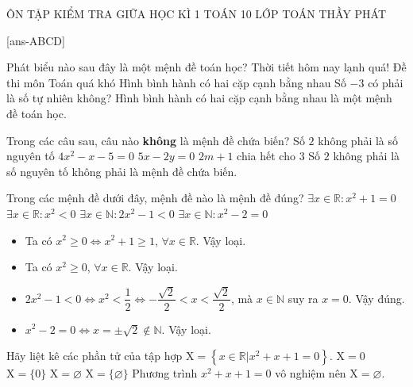 \begin{name}
	{ÔN TẬP KIỂM TRA GIỮA HỌC KÌ 1}
	{TOÁN 10}
	{LỚP TOÁN THẦY PHÁT}
	{\thoigian}
\end{name}

\caulc

[ans-ABCD]

\begin{ex}%
	Phát biểu nào sau đây là một mệnh đề toán học? 
	\choice
	{Thời tiết hôm nay lạnh quá!}
	{Đề thi môn Toán quá khó}
	{\True Hình bình hành có hai cặp cạnh bằng nhau}
	{Số $-3$ có phải là số tự nhiên không?}
	\loigiai
	{ Hình bình hành có hai cặp cạnh bằng nhau là một mệnh đề toán học.
	}
\end{ex}

\begin{ex}%
	Trong các câu sau, câu nào \textbf{không} là mệnh đề chứa biến? 
	\choice
	{\True Số $2$ không phải là số nguyên tố}
	{$4x^2-x-5=0$}
	{$5x-2y=0$}
	{$2m+1$ chia hết cho $3$}
	\loigiai
	{Số $2$ không phải là số nguyên tố không phải là mệnh đề chứa biến.
	}
\end{ex}

\begin{ex}%
	Trong các mệnh đề dưới đây, mệnh đề nào là mệnh đề đúng?  
	\choice
	{$\exists x \in \mathbb{R} \colon x^2+1=0$}
	{$\exists x \in \mathbb{R} \colon x^2<0$}
	{\True $\exists x \in \mathbb{N} \colon 2x^2-1<0$}
	{$\exists x \in \mathbb{N} \colon x^2-2=0$}
	\loigiai
	{
		\begin{itemize}
			\item Ta có $x^2 \geq 0 \Leftrightarrow x^2 +1 \geq 1$, $\forall x \in \mathbb{R}$. Vậy loại.
			\item Ta có $x^2 \geq 0$, $\forall x \in \mathbb{R}$. Vậy loại.
			\item $2x^2-1<0 \Leftrightarrow x^2<\dfrac{1}{2} \Leftrightarrow -\dfrac{\sqrt{2}}{2}<x<\dfrac{\sqrt{2}}{2}$, mà $x \in \mathbb{N}$ suy ra $x=0$. Vậy đúng.
			\item $x^2 -2=0 \Leftrightarrow x=\pm \sqrt{2} \notin \mathbb{N}$. Vậy loại.
		\end{itemize}
	}
\end{ex}

\begin{ex}%
	Hãy liệt kê các phần tử của tập hợp $\mathrm{X}=\left\{x \in \mathbb{R}|x^2+x+1=0\right\}$.
	\choice
	{$\mathrm{X}=0$}
	{$\mathrm{X}=\{0\}$}
	{\True $\mathrm{X}=\varnothing$}
	{$\mathrm{X}=\{\varnothing\}$}
	\loigiai
	{
		Phương trình $x^2+x+1=0$ vô nghiệm nên $\mathrm{X}=\varnothing$.
	}
\end{ex}

